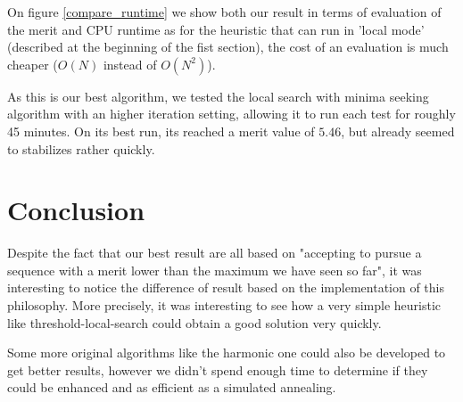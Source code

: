 \documentclass{article}
\begin{document}
  On figure \ref{compare_runtime} we show both our result in terms of
  evaluation of the merit and CPU runtime as for the heuristic that can run in
  'local mode' (described at the  beginning of the fist section), the cost of
  an evaluation is much cheaper ($O(N)$ instead of $O(N^2)$).

  As this is our best algorithm, we tested the local search with minima seeking
  algorithm with an higher iteration setting, allowing it to run each test for
  roughly 45 minutes. On its best run, its reached a merit value of $5.46$, but
  already seemed to stabilizes rather quickly.


\section{Conclusion}

  Despite the fact that our best result are all based on "accepting to pursue a
  sequence with a merit lower than the maximum we have seen so far", it was
  interesting to notice the difference of result based on the implementation of
  this philosophy. More precisely, it was interesting to see how a very simple
  heuristic like threshold-local-search could obtain a good solution very
  quickly.

  Some more original algorithms like the harmonic one could also be developed
  to get better results, however we didn't spend enough time to determine if
  they could be enhanced and as efficient as a simulated annealing.

{}

\end{document}
